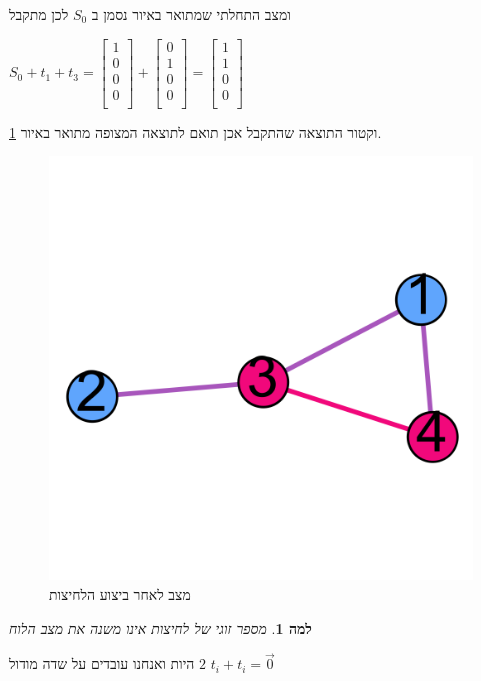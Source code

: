 \documentclass[12pt,leqno]{article}
\newtheorem{lemma}{למה}[section]
\begin{document}
ומצב התחלתי שמתואר באיור נסמן ב
$S_0$
לכן מתקבל

$
    S_0 + t_1 + t_3 = 
    \begin{bmatrix}
        1 \\
        0 \\
        0 \\
        0 \\
    \end{bmatrix}
    +
    \begin{bmatrix}
        0 \\
        1 \\
        0 \\
        0 \\
    \end{bmatrix}
    =
    \begin{bmatrix}
        1 \\
        1 \\
        0 \\
        0 \\
    \end{bmatrix}
$

וקטור התוצאה שהתקבל אכן תואם לתוצאה המצופה
מתואר באיור 
\ref{fig:start graph presses solution}.

\begin{figure}[ht]
    \caption{מצב לאחר ביצוע הלחיצות}
    \label{fig:start graph presses solution}
    \centering
    \includegraphics[width=.7\textwidth,height=.7\textheight,keepaspectratio]{images/graph_presses_solve.png}
\end{figure}

\begin{lemma}
    \label{lemma: sum same change vect}
    מספר זוגי של לחיצות אינו משנה את מצב הלוח
\end{lemma}
היות 
ואנחנו עובדים על שדה מודול 
$2$
$t_i + t_i = \vec{0}$
\end{document}
